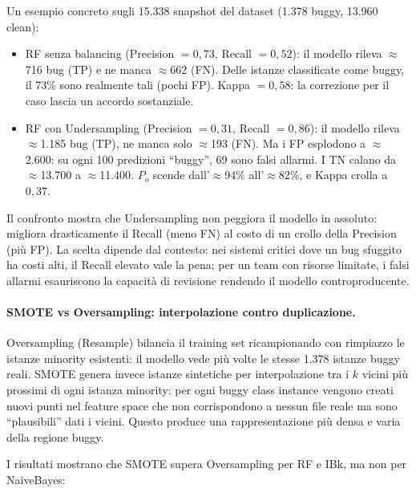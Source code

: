 \medskip

Un esempio concreto sugli 15.338 snapshot del dataset (1.378 buggy, 13.960 clean):

\begin{itemize}
\item RF senza balancing (Precision $= 0{,}73$, Recall $= 0{,}52$): il modello rileva
      $\approx$716 bug (TP) e ne manca $\approx$662 (FN). Delle istanze classificate
      come buggy, il 73\% sono realmente tali (pochi FP). Kappa $= 0{,}58$: la
      correzione per il caso lascia un accordo sostanziale.

\item RF con Undersampling (Precision $= 0{,}31$, Recall $= 0{,}86$): il modello
      rileva $\approx$1.185 bug (TP), ne manca solo $\approx$193 (FN). Ma i FP
      esplodono a $\approx$2.600: su ogni 100 predizioni ``buggy'', 69 sono falsi
      allarmi. I TN calano da $\approx$13.700 a $\approx$11.400. $P_o$ scende
      dall'$\approx$94\% all'$\approx$82\%, e Kappa crolla a $0{,}37$.
\end{itemize}

Il confronto mostra che Undersampling non peggiora il modello in assoluto: migliora
drasticamente il Recall (meno FN) al costo di un crollo della Precision (più FP).
La scelta dipende dal contesto: nei sistemi critici dove un bug sfuggito ha costi alti,
il Recall elevato vale la pena; per un team con risorse limitate, i falsi allarmi
esauriscono la capacità di revisione rendendo il modello controproducente.

\paragraph{SMOTE vs Oversampling: interpolazione contro duplicazione.}

Oversampling (Resample) bilancia il training set ricampionando con rimpiazzo le istanze
minority esistenti: il modello vede più volte le stesse 1.378 istanze buggy reali.
SMOTE genera invece istanze sintetiche per interpolazione tra i $k$ vicini più prossimi
di ogni istanza minority: per ogni buggy class instance vengono creati nuovi punti nel
feature space che non corrispondono a nessun file reale ma sono ``plausibili'' dati i
vicini. Questo produce una rappresentazione più densa e varia della regione buggy.

I risultati mostrano che SMOTE supera Oversampling per RF e IBk, ma non per NaiveBayes:


